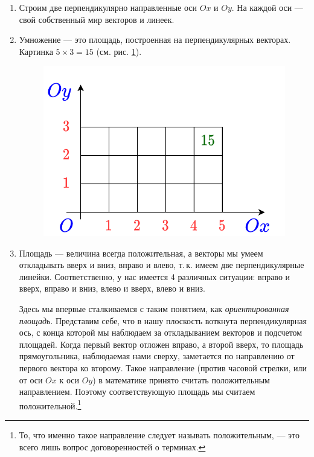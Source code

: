 \begin{enumerate}
\item Строим две перпендикулярно направленные оси $Ox$ и $Oy$. На каждой оси --- свой собственный мир векторов и линеек.
\item Умножение --- это площадь, построенная на перпендикулярных векторах. Картинка $5\times 3=15$ (см. рис. \ref{prod}).
\begin{figure}[hbt!]
\begin{center}
\includegraphics[scale=0.2]{prod.png}
\end{center}
\caption{}\label{prod}
\end{figure}
\item Площадь --- величина всегда положительная, а векторы мы умеем откладывать вверх и вниз, вправо и влево, т.\,к. имеем две перпендикулярные линейки. Соответственно, у нас имеется 4 различных ситуации: вправо и вверх, вправо и вниз, влево и вверх, влево и вниз.

Здесь мы впервые сталкиваемся с таким понятием, как \textit{ориентированная площадь}. Представим себе, что в нашу плоскость воткнута перпендикулярная ось, с конца которой мы наблюдаем за откладыванием векторов и подсчетом площадей. Когда первый вектор отложен вправо, а второй вверх, то площадь прямоугольника, наблюдаемая нами сверху, заметается по направлению от первого вектора ко второму. Такое направление (против часовой стрелки, или от оси $Ox$ к оси $Oy$) в математике принято считать положительным направлением. Поэтому соответствующую площадь мы считаем положительной.\footnote{То, что именно такое направление следует называть положительным, --- это всего лишь вопрос договоренностей о терминах.}


\end{enumerate}
